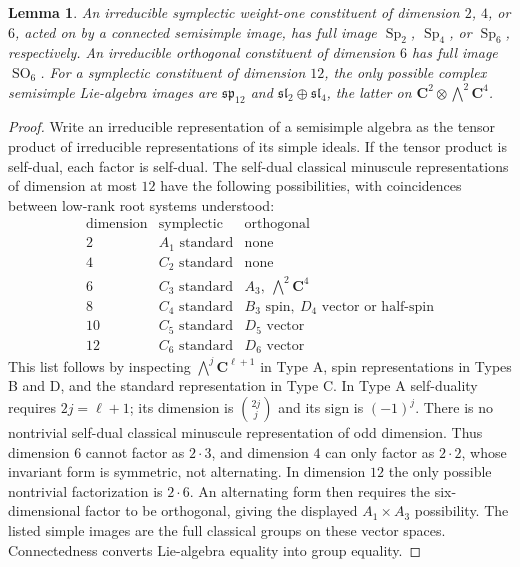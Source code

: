 \documentclass[11pt,reqno]{article}
\theoremstyle{emphasizedplain}
\theoremstyle{emphasizeddefinition}
\theoremstyle{emphasizeddefinition}
\newtheorem{prelemma}{Lemma}
\DeclareMathOperator{\Sp}{Sp}
\DeclareMathOperator{\SO}{SO}
\newcommand{\C}{\mathbf C}
\begin{document}
\begin{prelemma}\label{p:small}
An irreducible symplectic weight-one constituent of dimension $2$, $4$, or
$6$, acted on by a connected semisimple image, has full image $\Sp_2$,
$\Sp_4$, or $\Sp_6$, respectively. An irreducible orthogonal constituent of
dimension $6$ has full image $\SO_6$.
For a symplectic constituent of dimension $12$, the only possible
complex semisimple Lie-algebra images are $\mathfrak{sp}_{12}$ and
$\mathfrak{sl}_2\oplus\mathfrak{sl}_4$, the latter on
$\C^2\otimes\bigwedge^2\C^4$.
\end{prelemma}
\begin{proof}
Write an irreducible representation of a semisimple algebra as the tensor
product of irreducible representations of its simple ideals. If the tensor
product is self-dual, each factor is self-dual. The self-dual classical
minuscule representations of dimension at most $12$ have the following
possibilities, with coincidences between low-rank root systems understood:
\[
\begin{array}{c|c|c}
\text{dimension}&\text{symplectic}&\text{orthogonal}\\\hline
2& A_1\text{ standard}&\text{none}\\
4& C_2\text{ standard}&\text{none}\\
6& C_3\text{ standard}&A_3,\ \bigwedge^2\C^4\\
8& C_4\text{ standard}&B_3\text{ spin},\ D_4\text{ vector or half-spin}\\
10&C_5\text{ standard}&D_5\text{ vector}\\
12&C_6\text{ standard}&D_6\text{ vector}
\end{array}
\]
This list follows by inspecting $\bigwedge^j\C^{\ell+1}$ in Type A,
spin representations in Types B and D, and the standard representation in
Type C. In Type A self-duality requires $2j=\ell+1$; its dimension is
$\binom{2j}{j}$ and its sign is $(-1)^j$.
There is no nontrivial self-dual classical minuscule representation of odd
dimension. Thus dimension $6$ cannot factor as $2\cdot3$, and dimension $4$
can only factor as $2\cdot2$, whose invariant form is symmetric, not
alternating. In dimension $12$ the only possible nontrivial factorization is
$2\cdot6$. An alternating form then requires the six-dimensional factor to
be orthogonal, giving the displayed $A_1\times A_3$ possibility.
The listed simple images are the full classical groups on these vector
spaces. Connectedness converts Lie-algebra equality into group equality.
\end{proof}
\end{document}
